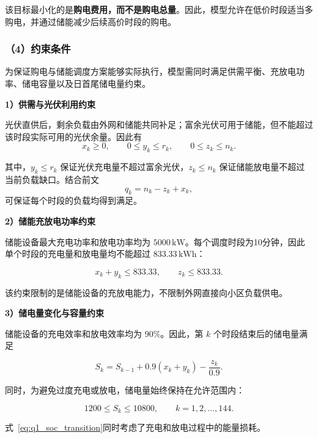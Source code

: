该目标最小化的是\textbf{购电费用，而不是购电总量}。因此，模型允许在低价时段适当多购电，并通过储能减少后续高价时段的购电。

\subsubsection*{（4）约束条件}

为保证购电与储能调度方案能够实际执行，模型需同时满足供需平衡、充放电功率、储电容量以及日首尾储电量约束。

\textbf{1）供需与光伏利用约束}

光伏直供后，剩余负载由外网和储能共同补足；富余光伏可用于储能，但不能超过该时段实际可用的光伏余量。因此有
\begin{equation}
x_k\geq 0,\qquad
0\leq y_k\leq r_k,\qquad
0\leq z_k\leq n_k.
\label{eq:q1_supply_constraint}
\end{equation}

其中，\(y_k\leq r_k\) 保证光伏充电量不超过富余光伏，\(z_k\leq n_k\) 保证储能放电量不超过当前负载缺口。结合前文
\[
q_k=n_k-z_k+x_k,
\]
可保证每个时段的负载均得到满足。

\textbf{2）储能充放电功率约束}

储能设备最大充电功率和放电功率均为 \(5000\,\mathrm{kW}\)。每个调度时段为10分钟，因此单个时段的充电量和放电量均不能超过 \(833.33\,\mathrm{kWh}\)：

\begin{equation}
x_k+y_k\leq833.33,\qquad
z_k\leq833.33.
\label{eq:q1_power_constraint}
\end{equation}

该约束限制的是储能设备的充放电能力，不限制外网直接向小区负载供电。

\textbf{3）储电量变化与容量约束}

储能设备的充电效率和放电效率均为 \(90\%\)。因此，第 \(k\) 个时段结束后的储电量满足

\begin{equation}
S_k
=
S_{k-1}
+0.9(x_k+y_k)
-\frac{z_k}{0.9}.
\label{eq:q1_soc_transition}
\end{equation}

同时，为避免过度充电或放电，储电量始终保持在允许范围内：

\begin{equation}
1200\leq S_k\leq10800,
\qquad k=1,2,\ldots,144.
\label{eq:q1_soc_bound}
\end{equation}

式~\eqref{eq:q1_soc_transition}同时考虑了充电和放电过程中的能量损耗。

